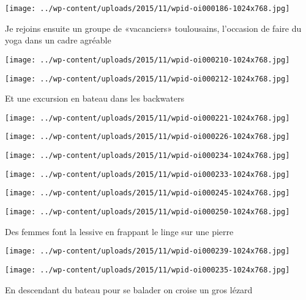 \centerline{\texttt{[image: ../wp-content/uploads/2015/11/wpid-oi000186-1024x768.jpg]} } 
 \newline
 Je rejoins ensuite un groupe de «vacanciers» toulousains, l'occasion de faire du yoga dans un cadre agréable \newline
 \newline
\centerline{\texttt{[image: ../wp-content/uploads/2015/11/wpid-oi000210-1024x768.jpg]} } 
 \newline
 \newline
\centerline{\texttt{[image: ../wp-content/uploads/2015/11/wpid-oi000212-1024x768.jpg]} } 
 \newline
 Et une excursion en bateau dans les backwaters \newline
 \newline
\centerline{\texttt{[image: ../wp-content/uploads/2015/11/wpid-oi000221-1024x768.jpg]} } 
 \newline
 \newline
\centerline{\texttt{[image: ../wp-content/uploads/2015/11/wpid-oi000226-1024x768.jpg]} } 
 \newline
 \newline
\centerline{\texttt{[image: ../wp-content/uploads/2015/11/wpid-oi000234-1024x768.jpg]} } 
 \newline
 \newline
\centerline{\texttt{[image: ../wp-content/uploads/2015/11/wpid-oi000233-1024x768.jpg]} } 
 \newline
 \newline
\centerline{\texttt{[image: ../wp-content/uploads/2015/11/wpid-oi000245-1024x768.jpg]} } 
 \newline
 \newline
\centerline{\texttt{[image: ../wp-content/uploads/2015/11/wpid-oi000250-1024x768.jpg]} } 
 \newline
 Des femmes font la lessive en frappant le linge sur une pierre \newline
 \newline
\centerline{\texttt{[image: ../wp-content/uploads/2015/11/wpid-oi000239-1024x768.jpg]} } 
 \newline
 \newline
\centerline{\texttt{[image: ../wp-content/uploads/2015/11/wpid-oi000235-1024x768.jpg]} } 
 \newline
 En descendant du bateau pour se balader on croise un gros lézard \newline
